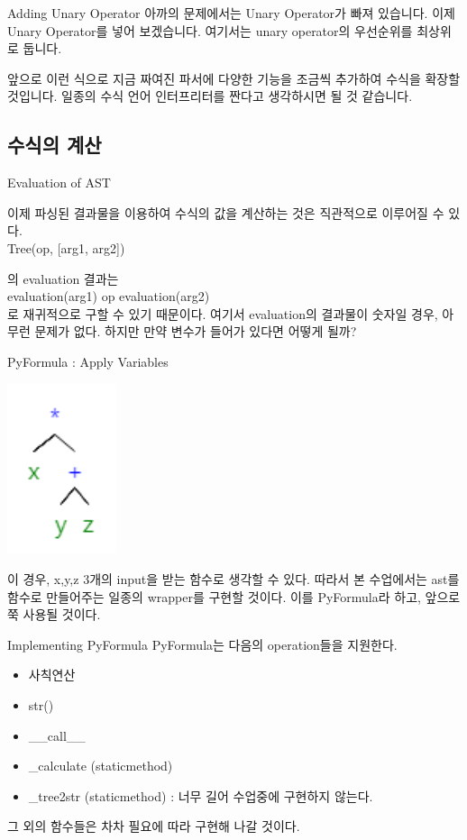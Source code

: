 \documentclass{beamer}
\begin{document}
\begin{frame}{Adding Unary Operator} 
아까의 문제에서는 Unary Operator가 빠져 있습니다. 이제 Unary Operator를 넣어 보겠습니다. 여기서는 unary operator의 우선순위를 최상위로 둡니다. 


앞으로 이런 식으로 지금 짜여진 파서에 다양한 기능을 조금씩 추가하여 수식을 확장할 것입니다. 일종의 수식 언어 인터프리터를 짠다고 생각하시면 될 것 같습니다. 
\end{frame}


\subsection{수식의 계산} 

\begin{frame}{Evaluation of AST} 

이제 파싱된 결과물을 이용하여 수식의 값을 계산하는 것은 직관적으로 이루어질 수 있다. \\

Tree(op, [arg1, arg2])

의 evaluation 결과는 \\

evaluation(arg1) op evaluation(arg2) \\

로 재귀적으로 구할 수 있기 때문이다. 여기서 evaluation의 결과물이 숫자일 경우, 아무런 문제가 없다. 하지만 만약 변수가 들어가 있다면 어떻게 될까? 
\end{frame}

\begin{frame}{PyFormula : Apply Variables} 

\includegraphics[height=5cm,keepaspectratio]{ast}

이 경우, x,y,z 3개의 input을 받는 함수로 생각할 수 있다. 따라서 본 수업에서는 ast를 함수로 만들어주는 일종의 wrapper를 구현할 것이다. 이를 PyFormula라 하고, 앞으로 쭉 사용될 것이다. 
\end{frame}

\begin{frame}{Implementing PyFormula} 
PyFormula는 다음의 operation들을 지원한다. 
\begin{itemize}
\item 사칙연산 
\item str()
\item \_\_call\_\_
\item \_calculate (staticmethod)
\item \_tree2str (staticmethod) : 너무 길어 수업중에 구현하지 않는다. 
\end{itemize}
그 외의 함수들은 차차 필요에 따라 구현해 나갈 것이다. 
\end{frame}
\end{document}
